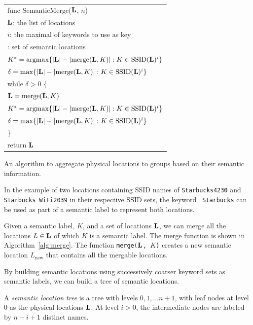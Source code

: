 \begin{algorithm}[h]
    \begin{tabular}{|l|} \hline
        func SemanticMerge($\mathbf{L}$, $n$) \\ 
        \RRR $\mathbf{L}$: the list of locations \\
        \RRR $i$: the maximal of keywords to use as key \\ 
        \RRR {\em returns}: set of semantic locations \\ \hline
        $K^* = \mathrm{argmax} \{|\mathbf{L}| - |\mathrm{merge}(\mathbf{L}, K)| : K\in\mathrm{SSID}(\mathbf{L})^i\}$ \\
        $\delta = \mathrm{max} \{|\mathbf{L}| - |\mathrm{merge}(\mathbf{L}, K)| : K\in\mathrm{SSID}(\mathbf{L})^i\}$ \\
        while $\delta > 0$ \{ \\
        \RRR $\mathbf{L} = \mathrm{merge}(\mathbf{L}, K)$ \\
        \RRR $K^* = \mathrm{argmax} \{|\mathbf{L}| - |\mathrm{merge}(\mathbf{L}, K)| : K\in\mathrm{SSID}(\mathbf{L})^i\}$ \\
        \RRR $\delta = \mathrm{max} \{|\mathbf{L}| - |\mathrm{merge}(\mathbf{L}, K)| : K\in\mathrm{SSID}(\mathbf{L})^i\}$ \\
        \}\\
        return $\mathbf{L}$ \\ \hline
    \end{tabular}
    \vspace{0.4cm}
    \caption{An algorithm to aggregate physical locations to groups based on
    their semantic information.}
    \label{alg:semantic}
\end{algorithm}



In the example of two locations containing SSID names of {\tt Starbucks4230} and
{\tt Starbucks WiFi2039} in their respective SSID sets, the keyword {\tt
Starbucks} can be used as part of a semantic label to represent both locations.

Given a semantic label, $K$, and a set of locations $\mathbf{L}$, we can merge all the
locations $L\in \mathbf{L}$ of which $K$ is a semantic label.  The merge function is
shown in Algorithm~\ref{alg:merge}.  The function {\tt merge($\mathbf{L}$, $K$)} 
creates a new semantic location $L_\mathrm{new}$ that contains all the mergable
locations.

By building semantic locations using successively coarser keyword sets as
semantic labels, we can build a tree of semantic locations.

\begin{definition}
    A {\em semantic location tree} is a tree with levels $0, 1, \dots n+1$, with leaf nodes at
    level 0 as the physical locations $\mathbf{L}$.  At level $i>0$, the intermediate
    nodes are labeled by $n-i+1$ distinct names.
\end{definition}

